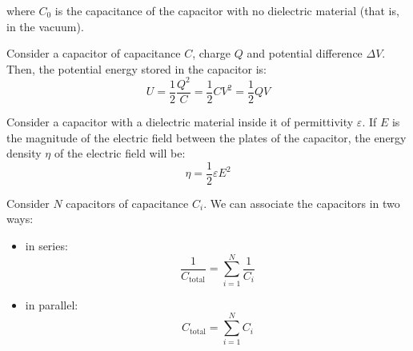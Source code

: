 \documentclass[../../../main.tex]{subfiles}
\begin{document}
\begin{multicols}{2}
\begin{prop}
    where $C_0$ is the capacitance of the capacitor with no dielectric material (that is, in the vacuum).
  \end{prop}
  \begin{prop}
    Consider a capacitor of capacitance $C$, charge $Q$ and potential difference $\Delta V$. Then, the potential energy stored in the capacitor is: $$U=\frac{1}{2}\frac{Q^2}{C}=\frac{1}{2}CV^2=\frac{1}{2}QV$$
  \end{prop}
  \begin{prop}
    Consider a capacitor with a dielectric material inside it of permittivity $\varepsilon$. If $E$ is the magnitude of the electric field between the plates of the capacitor, the energy density $\eta$ of the electric field will be: $$\eta=\frac{1}{2}\varepsilon E^2$$
  \end{prop}
  \begin{prop}
    Consider $N$ capacitors of capacitance $C_i$. We can associate the capacitors in two ways:
    \begin{itemize}
      \item in series: $$\frac{1}{C_\text{total}}=\sum_{i=1}^N\frac{1}{C_i}$$
      \item in parallel: $$C_\text{total}=\sum_{i=1}^NC_i$$
    \end{itemize}
  \end{prop}

\end{multicols}
\end{document}

